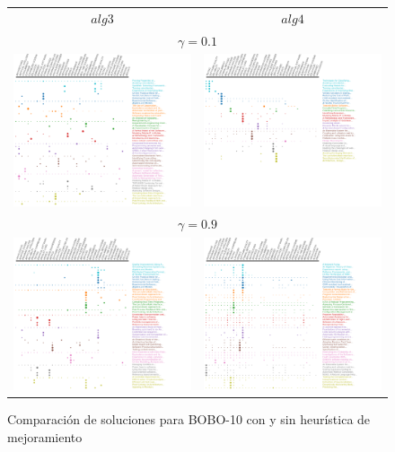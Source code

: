 \begin{figure}[H]
	\centering
	\begin{tabular}{cc}
		$alg3$ & $alg4$\\
		\multicolumn{2}{c}{$\gamma=0.1$}\\
			\includegraphics[width=0.5\linewidth]{img/gamma-01-alg-3.png}&
			\includegraphics[width=0.5\linewidth]{img/gamma-01-alg-4.png} 		\vspace{1cm}\\
		\multicolumn{2}{c}{$\gamma=0.9$}\\
			\includegraphics[width=0.5\linewidth]{img/gamma-09-alg-3.png}&
			\includegraphics[width=0.5\linewidth]{img/gamma-09-alg-4.png}\\
	\end{tabular}
	\caption{Comparación de soluciones para BOBO-10 con y sin heurística de mejoramiento}
	\label{res:bobo}
\end{figure}

